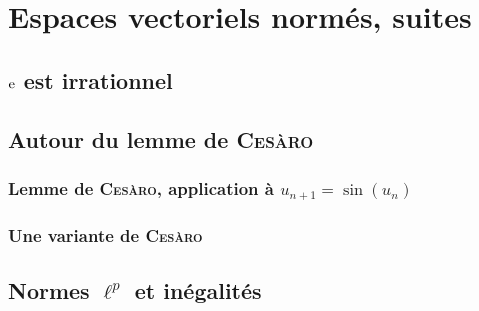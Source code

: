 \chapter{Espaces vectoriels normés, suites}

\section{\texorpdfstring{$\mathrm{e}$}{e} est irrationnel}


\section{Autour du lemme de \textsc{Cesàro}}

\subsection{Lemme de \textsc{Cesàro}, application à \texorpdfstring{$u_{n+1}=\sin(u_n)$}{u_n+1 = sin(u_n)}}


\subsection{Une variante de \textsc{Cesàro}}


\section{Normes \texorpdfstring{$\ell^p$}{l^p} et inégalités}



